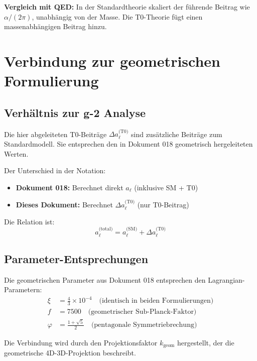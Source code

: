 	\textbf{Vergleich mit QED:} In der Standardtheorie skaliert der führende Beitrag wie $\alpha/(2\pi)$, unabhängig von der Masse. Die T0-Theorie fügt einen massenabhängigen Beitrag hinzu.
	
	\section{Verbindung zur geometrischen Formulierung}
	
	\subsection{Verhältnis zur g-2 Analyse}
	
	Die hier abgeleiteten T0-Beiträge $\Delta a_\ell^{\text{(T0)}}$ sind zusätzliche Beiträge zum Standardmodell. Sie entsprechen den in Dokument 018 geometrisch hergeleiteten Werten.
	
	Der Unterschied in der Notation:
	\begin{itemize}
		\item \textbf{Dokument 018:} Berechnet direkt $a_\ell$ (inklusive SM + T0)
		\item \textbf{Dieses Dokument:} Berechnet $\Delta a_\ell^{\text{(T0)}}$ (nur T0-Beitrag)
	\end{itemize}
	
	Die Relation ist:
	\begin{equation}
		a_\ell^{\text{(total)}} = a_\ell^{\text{(SM)}} + \Delta a_\ell^{\text{(T0)}}
		\label{eq:total_relation}
	\end{equation}
	
	\subsection{Parameter-Entsprechungen}
	
	Die geometrischen Parameter aus Dokument 018 entsprechen den Lagrangian-Parametern:
	\begin{align}
		\xi &= \frac{4}{3} \times 10^{-4} \quad \text{(identisch in beiden Formulierungen)} \label{eq:xi_correspondence} \\
		f &= 7500 \quad \text{(geometrischer Sub-Planck-Faktor)} \label{eq:f_correspondence} \\
		\varphi &= \frac{1+\sqrt{5}}{2} \quad \text{(pentagonale Symmetriebrechung)} \label{eq:phi_correspondence}
	\end{align}
	
	Die Verbindung wird durch den Projektionsfaktor $k_{\text{geom}}$ hergestellt, der die geometrische 4D-3D-Projektion beschreibt.
	
